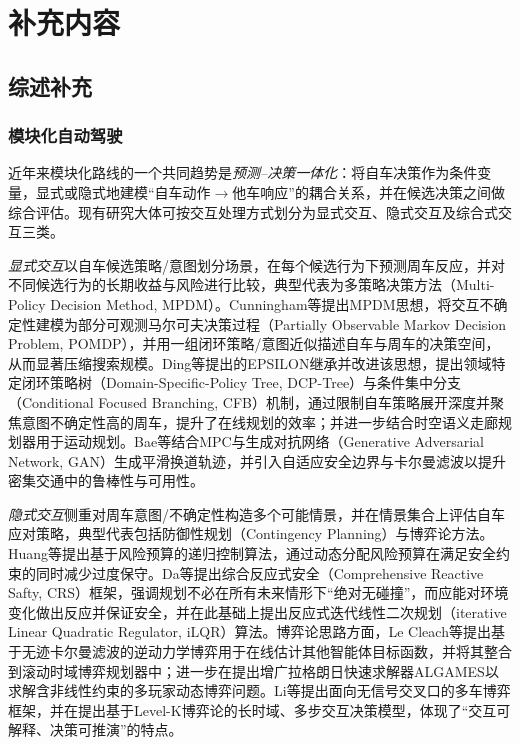 
\chapter{补充内容}


\section{综述补充}
  \subsection{模块化自动驾驶} 
  \label{sub:pipeline}
    近年来模块化路线的一个共同趋势是\emph{预测--决策一体化}：将自车决策作为条件变量，显式或隐式地建模“自车动作$\rightarrow$他车响应”的耦合关系，并在候选决策之间做综合评估。现有研究大体可按交互处理方式划分为显式交互、隐式交互及综合式交互三类。

    \emph{显式交互}以自车候选策略/意图划分场景，在每个候选行为下预测周车反应，并对不同候选行为的长期收益与风险进行比较，典型代表为多策略决策方法（Multi-Policy Decision Method, MPDM）。Cunningham等\cite{cunningham2015mpdm,galceran2017changepoint}提出MPDM思想，将交互不确定性建模为部分可观测马尔可夫决策过程（Partially Observable Markov Decision Problem, POMDP），并用一组闭环策略/意图近似描述自车与周车的决策空间，从而显著压缩搜索规模。Ding等提出的EPSILON\cite{ding2022epsilon}继承并改进该思想，提出领域特定闭环策略树（Domain-Specific-Policy Tree, DCP-Tree）与条件集中分支（Conditional Focused Branching, CFB）机制\cite{zhang2020guidedbranching}，通过限制自车策略展开深度并聚焦意图不确定性高的周车，提升了在线规划的效率；并进一步结合时空语义走廊规划器\cite{ding2019semanticcorridor}用于运动规划。Bae等\cite{bae2023lanechange}结合MPC与生成对抗网络（Generative Adversarial Network, GAN）生成平滑换道轨迹，并引入自适应安全边界与卡尔曼滤波以提升密集交通中的鲁棒性与可用性。

    \emph{隐式交互}侧重对周车意图/不确定性构造多个可能情景，并在情景集合上评估自车应对策略，典型代表包括防御性规划（Contingency Planning）\cite{salvado2016contingency}与博弈论方法。Huang等\cite{huang2021riskbudget}提出基于风险预算的递归控制算法，通过动态分配风险预算在满足安全约束的同时减少过度保守。Da等\cite{da2022reactivesafety}提出综合反应式安全（Comprehensive Reactive Safty, CRS）框架，强调规划不必在所有未来情形下“绝对无碰撞”，而应能对环境变化做出反应并保证安全，并在此基础上提出反应式迭代线性二次规划（iterative Linear Quadratic Regulator, iLQR）算法。博弈论思路方面，Le Cleach等\cite{li2018gametheoryacc}提出基于无迹卡尔曼滤波的逆动力学博弈用于在线估计其他智能体目标函数，并将其整合到滚动时域博弈规划器中；进一步在\cite{li2020gametheorytits}提出增广拉格朗日快速求解器ALGAMES以求解含非线性约束的多玩家动态博弈问题。Li等\cite{lecleach2020lucidgames}提出面向无信号交叉口的多车博弈框架，并在\cite{lecleach2022algames}提出基于Level-K博弈论的长时域、多步交互决策模型，体现了“交互可解释、决策可推演”的特点。

